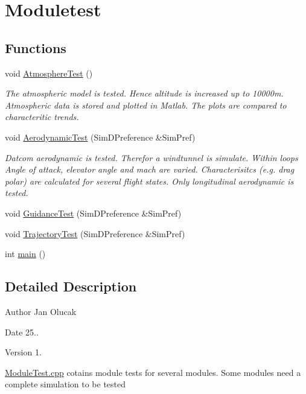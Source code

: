 \hypertarget{group___moduletest}{}\section{Moduletest}
\label{group___moduletest}
\subsection*{Functions}
\begin{DoxyCompactItemize}
\item 
void \hyperlink{group___moduletest_gad43a0024f4d65199da1e138730b77366}{Atmosphere\+Test} ()
\begin{DoxyCompactList}\small\item\em The atmospheric model is tested. Hence altitude is increased up to 10000m. Atmospheric data is stored and plotted in Matlab. The plots are compared to characteritic trends. \end{DoxyCompactList}\item 
void \hyperlink{group___moduletest_gaa6c5f38a2905aa430098c2bbc54294ae}{Aerodynamic\+Test} (Sim\+D\+Preference \&Sim\+Pref)
\begin{DoxyCompactList}\small\item\em Datcom aerodynamic is tested. Therefor a windtunnel is simulate. Within loops Angle of attack, elevator angle and mach are varied. Characterisitcs (e.\+g. drag polar) are calculated for several flight states. Only longitudinal aerodynamic is tested. \end{DoxyCompactList}\item 
void \hyperlink{group___moduletest_ga506ca9f8cae8f5ef59e2ae58b867384e}{Guidance\+Test} (Sim\+D\+Preference \&Sim\+Pref)
\item 
void \hyperlink{group___moduletest_ga3f0bd743f32651aeae72d8d92cd97104}{Trajectory\+Test} (Sim\+D\+Preference \&Sim\+Pref)
\item 
int \hyperlink{group___moduletest_gae66f6b31b5ad750f1fe042a706a4e3d4}{main} ()
\end{DoxyCompactItemize}


\subsection{Detailed Description}
\begin{DoxyAuthor}{Author}
Jan Olucak 
\end{DoxyAuthor}
\begin{DoxyDate}{Date}
25.. 
\end{DoxyDate}
\begin{DoxyVersion}{Version}
1.
\end{DoxyVersion}
\hyperlink{_module_test_8cpp}{Module\+Test.\+cpp} cotains module tests for several modules. Some modules need a complete simulation to be tested 

